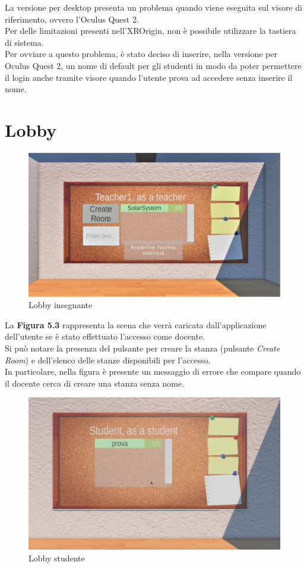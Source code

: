 \hspace{-0.6cm}La versione per desktop presenta un problema quando viene eseguita sul visore di riferimento, ovvero l’Oculus Quest 2. 
\\Per delle limitazioni presenti nell’XROrigin, non è possibile utilizzare la tastiera di sistema. 
\\Per ovviare a questo problema, è stato deciso di inserire, nella versione per Oculus Quest 2, un nome di default per gli studenti in modo da poter permettere il login anche tramite visore quando l'utente prova ad accedere senza inserire il nome.
\section{Lobby}
\begin{figure}[H]
\centering
\includegraphics[scale = 0.25]{Immagini/Dimostrazioni d'uso/createroomerr.jpg}
\caption{Lobby insegnante}
\end{figure}
La \textbf{Figura 5.3} rappresenta la scena che verrà caricata dall'applicazione dell'utente se è stato effettuato l'accesso come docente.
\\Si può notare la presenza del pulsante per creare la stanza (pulsante \textit{Create Room}) e dell'elenco delle stanze disponibili per l'accesso.
\\In particolare, nella figura è presente un messaggio di errore che compare quando il docente cerca di creare una stanza senza nome.
\begin{figure}[H]
\centering
\includegraphics[scale = 0.25]{Immagini/Dimostrazioni d'uso/studlobby.jpg}
\caption{Lobby studente}
\end{figure}
